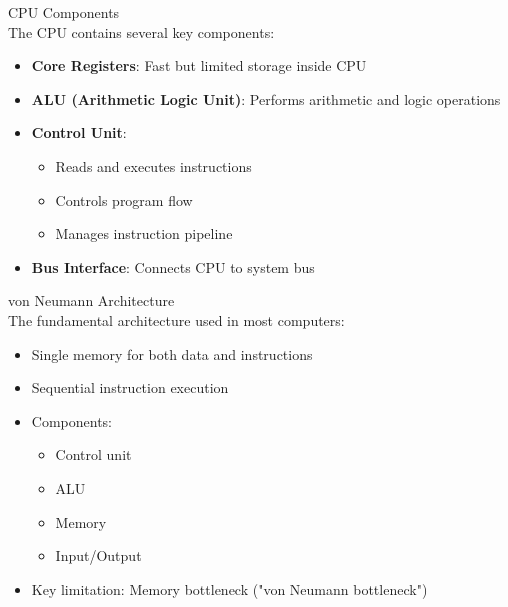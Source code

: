 \begin{definition}{CPU Components}\\
The CPU contains several key components:
\begin{itemize}
  \item \textbf{Core Registers}: Fast but limited storage inside CPU
  \item \textbf{ALU (Arithmetic Logic Unit)}: Performs arithmetic and logic operations
  \item \textbf{Control Unit}: 
    \begin{itemize}
      \item Reads and executes instructions
      \item Controls program flow
      \item Manages instruction pipeline
    \end{itemize}
  \item \textbf{Bus Interface}: Connects CPU to system bus
\end{itemize}
\end{definition}

\begin{concept}{von Neumann Architecture}\\
The fundamental architecture used in most computers:
\begin{itemize}
  \item Single memory for both data and instructions
  \item Sequential instruction execution
  \item Components:
    \begin{itemize}
      \item Control unit
      \item ALU
      \item Memory
      \item Input/Output
    \end{itemize}
  \item Key limitation: Memory bottleneck ("von Neumann bottleneck")
\end{itemize}
\end{concept}

